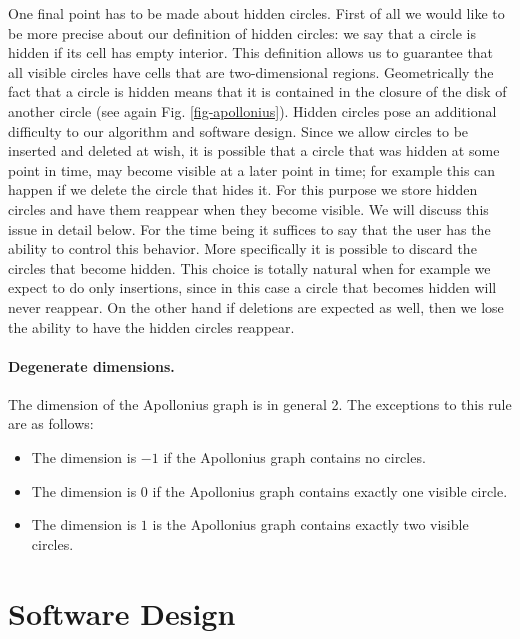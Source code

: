 One final point has to be made about hidden circles. First of all we
would like to be more precise about our definition of hidden circles:
we say that a circle is hidden if its cell has empty interior. This
definition allows us to guarantee that all visible circles have
cells that are two-dimensional regions.
Geometrically the fact that a circle is hidden means that it is
contained in the closure of the disk of another circle (see again
Fig. \ref{fig-apollonius}). Hidden circles pose an additional
difficulty to our algorithm and software design. Since we allow
circles to be inserted and deleted at wish, it is possible that a
circle that was hidden at some point in time, may become visible at
a later point in time; for example this can happen if we delete the
circle that hides it. For this purpose we store hidden circles and
have them reappear when they become visible. We will discuss this
issue in detail below. For the time being it suffices to say that the
user has the ability to control this behavior. More specifically it is
possible to discard the circles that become hidden. This choice is
totally natural when for example we expect to do only insertions,
since in this case a circle that becomes hidden will never
reappear. On the other hand if deletions are expected as well, then we
lose the ability to have the hidden circles reappear.

\paragraph{Degenerate dimensions.}
The dimension of the Apollonius graph is in general 2. The exceptions
to this rule are as follows:
\begin{itemize}
\item The dimension is $-1$ if the Apollonius graph contains no circles.
\item The dimension is $0$ if the Apollonius graph contains exactly
  one visible circle.
\item The dimension is $1$ is the Apollonius graph contains exactly
  two visible circles.
\end{itemize}


\section{Software Design}
\label{sec:apollonius2-design}

